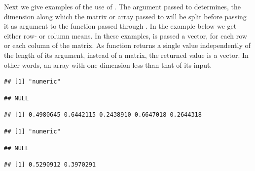\documentclass[krantz2]{krantz}\usepackage{knitr}%
\begin{document}
Next we give examples of the use of . The argument passed to  determines, the dimension along which the matrix or array passed to  will be split before passing it as argument to the function passed through . In the example below we get either row- or column means. In these examples,  is passed a vector, for each row or each column of the matrix. As function  returns a single value independently of the length of its argument, instead of a matrix, the returned value is a vector. In other words, an array with one dimension less than that of its input.

\begin{knitrout}\footnotesize
{}\color{fgcolor}\begin{kframe}
\begin{alltt}
\hlstd{(}\hlstd{)}
 \hlkwb{<-} \hlstd{(}\hlstd{(}\hlstd{),}  \hlstd{=} \hlstd{)}
 \hlkwb{<-} \hlstd{(}   \hlstd{=} \hlstd{,}    \hlstd{=} \hlstd{)}
\end{alltt}
\begin{verbatim}
## [1] "numeric"
\end{verbatim}
\begin{alltt}
\end{alltt}
\begin{verbatim}
## NULL
\end{verbatim}
\begin{alltt}
\end{alltt}
\begin{verbatim}
## [1] 0.4980645 0.6442115 0.2438910 0.6647018 0.2644318
\end{verbatim}
\begin{alltt}
 \hlkwb{<-} \hlstd{(}   \hlstd{=} \hlstd{,}    \hlstd{=} \hlstd{)}
\end{alltt}
\begin{verbatim}
## [1] "numeric"
\end{verbatim}
\begin{alltt}
\end{alltt}
\begin{verbatim}
## NULL
\end{verbatim}
\begin{alltt}
\end{alltt}
\begin{verbatim}
## [1] 0.5290912 0.3970291
\end{verbatim}
\end{kframe}
\end{knitrout}
\end{document}

